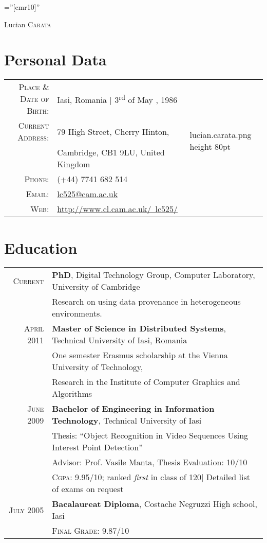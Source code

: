 \documentclass[a4paper,11pt]{article}
\begin{document}
\pagestyle{empty} 		%
\font\fb=''[cmr10]'' 	%

\par{\centering
		{\Huge Lucian \textsc{Carata}
	}\\
\medskip
\bigskip\par}

%
\thispagestyle{plain}
\section{Personal Data}
\begin{tabular}{rp{3.2in}l}
    \textsc{Place \& Date of Birth:} & Iasi, Romania  | 3\textsuperscript{rd} of May , 1986 &\multirow{5}{*}{
	 \XeTeXpicfile lucian.carata.png height 80pt}\\
    \textsc{Current Address:}   & 79 High Street, Cherry Hinton, \\&Cambridge, CB1 9LU, United Kingdom\bigskip\\
    \textsc{Phone:}     & (+44) 7741 682 514\\
    \textsc{Email:}     & \href{mailto:lc525@cam.ac.uk}{lc525@cam.ac.uk}\\
	\textsc{Web:}		& \href{http://www.cl.cam.ac.uk/\string~lc525/}{http://www.cl.cam.ac.uk/\string~lc525/}
\end{tabular}

%
\section{Education}
\begin{tabular}{rl}
 \textsc{Current} & {\bf PhD}, Digital Technology Group, Computer Laboratory, University of Cambridge\\
& Research on using data provenance in heterogeneous environments. \smallskip\\
 \textsc{April} 2011 & {\bf Master of Science in Distributed Systems}, Technical University of Iasi, Romania\\
& One semester Erasmus scholarship at the Vienna University of Technology, \\& Research in the Institute of Computer Graphics and Algorithms\smallskip\\
 \textsc{June} 2009 & {\bf Bachelor of Engineering in Information Technology}, Technical University of Iasi\\
& Thesis: ``Object Recognition in Video Sequences Using Interest Point Detection''\\
& Advisor: Prof. Vasile Manta,  Thesis Evaluation: 10/10\smallskip\\
&\normalsize \textsc{Cgpa}: 9.95/10; ranked \emph{first} in class of 120\hfill | \footnotesize Detailed list of exams on request\smallskip\\
\textsc{July} 2005& {\bf Bacalaureat Diploma}, \normalsize Costache Negruzzi High school, Iasi\\
&\normalsize \textsc{Final Grade}: 9.87/10
\end{tabular}
\end{document}

